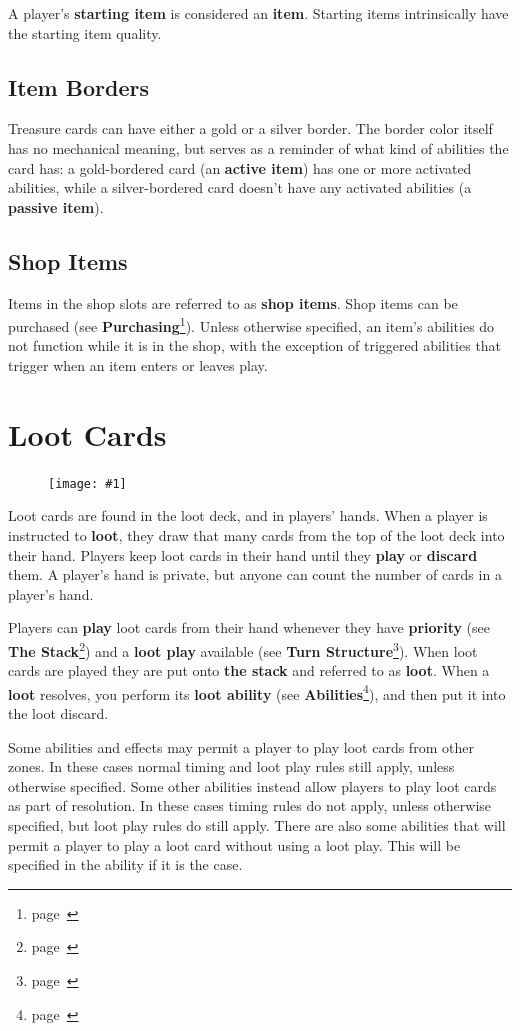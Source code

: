 \documentclass[
  fontsize=10pt,
  paper=a5,
  version=last,
  chapterprefix=true,
  bindingoffset=5mm,
  ]{scrbook}
\newcommand{\cardw}{0.3\textwidth}
\newcommand{\cardfigv}[1]{
    \begin{figure}
        \texttt{[image: \#1]}
    \end{figure}
}
\begin{document}
    A player’s \textbf{starting item} is considered an \textbf{item}. Starting items intrinsically have the starting item quality.

    \subsection{Item Borders}
    Treasure cards can have either a gold or a silver border. The border color itself has no mechanical meaning, but serves as a reminder of what kind of abilities the card has: a gold-bordered card (an \textbf{active item}) has one or more activated abilities, while a silver-bordered card doesn’t have any activated abilities (a \textbf{passive item}).

    \subsection{Shop Items}
    Items in the shop slots are referred to as \textbf{shop items}. Shop items can be purchased (see \textbf{Purchasing}\footnote{page~\pageref{purchasing}}). Unless otherwise specified, an item’s abilities do not function while it is in the shop, with the exception of triggered abilities that trigger when an item enters or leaves play.

    \section{Loot Cards}
    \cardfigv{assets/loot.png}
    Loot cards are found in the loot deck, and in players’ hands. When a player is instructed to \textbf{loot}, they draw that many cards from the top of the loot deck into their hand. Players keep loot cards in their hand until they \textbf{play} or \textbf{discard} them. A player’s hand is private, but anyone can count the number of cards in a player’s hand.

    Players can \textbf{play} loot cards from their hand whenever they have \textbf{priority} (see \textbf{The Stack}\footnote{page~\pageref{stack}}) and a \textbf{loot play} available (see \textbf{Turn Structure}\footnote{page~\pageref{turn}}). When loot cards are played they are put onto \textbf{the stack} and referred to as \textbf{loot}. When a \textbf{loot} resolves, you perform its \textbf{loot ability} (see \textbf{Abilities}\footnote{page~\pageref{abilities}}), and then put it into the loot discard.

    Some abilities and effects may permit a player to play loot cards from other zones. In these cases normal timing and loot play rules still apply, unless otherwise specified. Some other abilities instead allow players to play loot cards as part of resolution. In these cases timing rules do not apply, unless otherwise specified, but loot play rules do still apply. There are also some abilities that will permit a player to play a loot card without using a loot play. This will be specified in the ability if it is the case.
\end{document}
